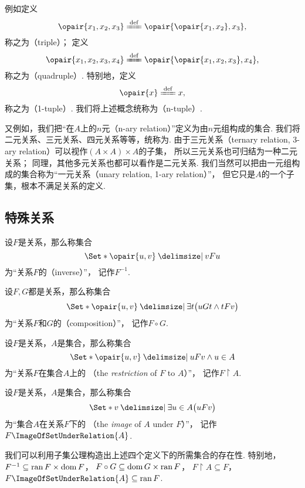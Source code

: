 例如定义\[
	\opair{x_1,x_2,x_3}
	\defeq
	\opair{\opair{x_1,x_2},x_3},
\]称之为（triple）；
定义\[
	\opair{x_1,x_2,x_3,x_4}
	\defeq
	\opair{\opair{x_1,x_2,x_3},x_4},
\]称之为（quadruple）.
特别地，定义\[
	\opair{x}
	\defeq
	x,
\]称之为（1-tuple）.
我们将上述概念统称为（n-tuple）.

又例如，我们把“在\(A\)上的\(n\)元（n-ary relation）”定义为由\(n\)元组构成的集合.
我们将二元关系、三元关系、四元关系等等，统称为.
由于三元关系（ternary relation, 3-ary relation）可以视作\((A \times A) \times A\)的子集，
所以三元关系也可归结为一种二元关系；
同理，其他多元关系也都可以看作是二元关系.
我们当然可以把由一元组构成的集合称为“一元关系（unary relation, 1-ary relation）”，
但它只是\(A\)的一个子集，根本不满足关系的定义.

\subsection{特殊关系}
\begin{definition}
设\(F\)是关系，那么称集合\[
	\Set*{ \opair{u,v} \given v F u }
\]为“关系\(F\)的（inverse）”，
记作\(F^{-1}\).
\end{definition}

\begin{definition}
设\(F,G\)都是关系，那么称集合\[
	\Set*{ \opair{u,v} \given \exists t \bigl( u G t \land t F v \bigr) }
\]为“关系\(F\)和\(G\)的（composition）”，
记作\(F \circ G\).
\end{definition}

\begin{definition}
设\(F\)是关系，\(A\)是集合，那么称集合\[
	\Set*{ \opair{u,v} \given u F v \land u \in A }
\]为“关系\(F\)在集合\(A\)上的%
（the \emph{restriction} of \(F\) to \(A\)）”，
记作\(F \upharpoonright A\).
\end{definition}

\begin{definition}
设\(F\)是关系，\(A\)是集合，那么称集合\[
	\Set*{ v \given \exists u \in A \bigl( u F v \bigr) }
\]为“集合\(A\)在关系\(F\)下的%
（the \emph{image} of \(A\) under \(F\)）”，
记作\(F\ImageOfSetUnderRelation{A}\).
\end{definition}

我们可以利用子集公理构造出上述四个定义下的所需集合的存在性.
特别地，
\(F^{-1} \subseteq \operatorname{ran} F \times \operatorname{dom} F\)，
\(F \circ G \subseteq \operatorname{dom} G \times \operatorname{ran} F\)，
\(F \upharpoonright A \subseteq F\)，
\(F\ImageOfSetUnderRelation{A} \subseteq \ran F\).

